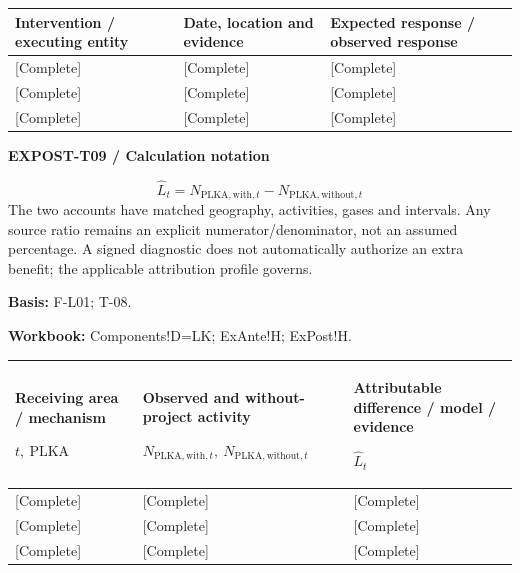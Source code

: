 {\sffamily\fontsize{8.3}{10.3}\selectfont\begin{longtable}{@{}P{54.83mm} P{54.83mm} P{54.83mm}@{}}
\toprule
\textbf{Intervention / executing entity} & \textbf{Date, location and evidence} & \textbf{Expected response / observed response}\\\midrule\endhead
\rule{0pt}{8mm}[Complete] & [Complete] & [Complete]\\\hline
\rule{0pt}{8mm}[Complete] & [Complete] & [Complete]\\\hline
\rule{0pt}{8mm}[Complete] & [Complete] & [Complete]\\\hline
\end{longtable}}
\par\begingroup\sffamily\fontsize{8}{10}\selectfont\color{NEBGreen}\setlength{\parskip}{2pt}\setlength{\abovedisplayskip}{4pt}\setlength{\belowdisplayskip}{4pt}\setlength{\abovedisplayshortskip}{2pt}\setlength{\belowdisplayshortskip}{3pt}
\textbf{EXPOST-T09 / Calculation notation}\par
{\fontsize{9}{11}\selectfont\[ \widehat L_t=N_{\mathrm{PLKA,with},t}-N_{\mathrm{PLKA,without},t} \]}
The two accounts have matched geography, activities, gases and intervals. Any source ratio remains an explicit numerator/denominator, not an assumed percentage. A signed diagnostic does not automatically authorize an extra benefit; the applicable attribution profile governs.\par
\textbf{Basis:} F-L01; T-08.\par
\textbf{Workbook:} Components!D=LK; ExAnte!H; ExPost!H.\par\endgroup
{\sffamily\fontsize{8.3}{10.3}\selectfont\begin{longtable}{@{}P{54.83mm} P{54.83mm} P{54.83mm}@{}}
\toprule
\textbf{Receiving area / mechanism}\par {\normalfont\fontsize{8.2}{10}\selectfont $t,\ \mathrm{PLKA}$} & \textbf{Observed and without-project activity}\par {\normalfont\fontsize{8.2}{10}\selectfont $N_{\mathrm{PLKA,with},t},\ N_{\mathrm{PLKA,without},t}$} & \textbf{Attributable difference / model / evidence}\par {\normalfont\fontsize{8.2}{10}\selectfont $\widehat L_t$}\\\midrule\endhead
\rule{0pt}{8mm}[Complete] & [Complete] & [Complete]\\\hline
\rule{0pt}{8mm}[Complete] & [Complete] & [Complete]\\\hline
\rule{0pt}{8mm}[Complete] & [Complete] & [Complete]\\\hline
\end{longtable}}
